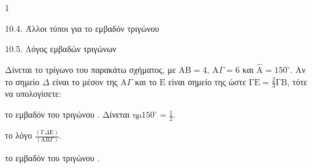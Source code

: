 \begin{ylh}{1}
    \item 10.4. Άλλοι τύποι για το εμβαδόν τριγώνου
    \item 10.5. Λόγος εμβαδών τριγώνων
\end{ylh}
\begin{figure}
\centering
{}
\end{figure}
Δίνεται το τρίγωνο \Gamma του παρακάτω σχήματος, με $\text{AB}=4$, $\text{A}\Gamma=6$ και $\hat{\text{A}} = 150^\circ$. Αν το σημείο $\Delta$ είναι το μέσον της $\text{A}\Gamma$ και το $\text{E}$ είναι σημείο της \Gamma ώστε $\text{ΓE} = \frac{2}{3}\text{ΓB}$, τότε να υπολογίσετε:
\begin{alist}
\item το εμβαδόν του τριγώνου \Gamma. Δίνεται $\text{ημ}150^\circ = \frac{1}{2}$. 
\item το λόγο $\frac{(\text{Γ}\Delta\text{E})}{(\text{AB}\Gamma)}$. 
\item το εμβαδόν του τριγώνου \Delta{}. 
\end{alist}